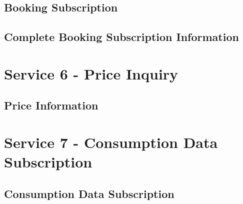 \subsection*{Booking Subscription}
\label{subsec:Nachrichten:Dienst5:BookingAlertSubscription}





% 

% 



\subsection*{Complete Booking Subscription Information}
\label{subsec:Nachrichten:Dienst5:CompleteBookingAlert}





\section{Service 6 - Price Inquiry}
\label{sec:Nachrichten:Dienst6}

\subsection*{Price Information}
\label{subsec:Nachrichten:Dienst6:PriceInformation}





\section{Service 7 - Consumption Data Subscription}
\label{sec:Nachrichten:Dienst7}

\subsection*{Consumption Data Subscription}
\label{subsec:Nachrichten:Dienst7:ConsumptionSubscription}









